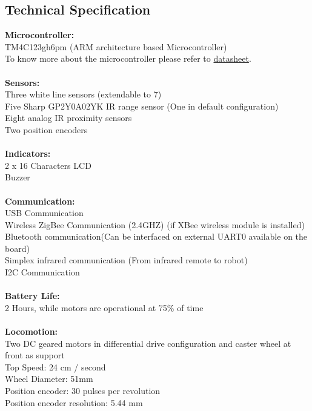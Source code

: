\documentclass[a4paper,10pt,oneside]{article}
\begin{document}
{		\subsection{{\textbf{Technical Specification}}\\}
			{\textbf{Microcontroller:\\}
			TM4C123gh6pm (ARM architecture based Microcontroller)\\ To know more about the microcontroller please refer to \href{www.ti.com/lit/gpn/tm4c123gh6pm}{datasheet}.\\ \\}
			{\textbf{Sensors:}\\
			Three white line sensors (extendable to 7)\\
			Five Sharp GP2Y0A02YK IR range sensor (One in default configuration)\\
			Eight analog IR proximity sensors\\
			Two position encoders\\\\} 
			\textbf{Indicators:\\}
			{2 x 16 Characters LCD\\
			Buzzer\\\\}
			\textbf{Communication:\\}
			{USB Communication\\
			Wireless ZigBee Communication (2.4GHZ) (if XBee wireless module is installed)\\
			Bluetooth communication(Can be interfaced on external UART0 available on the board)\\
			Simplex infrared communication (From infrared remote to robot)\\
			I2C Communication \\\\}
			\textbf{Battery Life:\\}
			{2 Hours, while motors are operational at 75\% of time\\\\}
			\textbf{Locomotion:\\}
			{Two DC geared motors in differential drive configuration and caster wheel at front as support\\
			Top Speed: 24 cm / second\\
			Wheel Diameter: 51mm\\
			Position encoder: 30 pulses per revolution\\
			Position encoder resolution: 5.44 mm\\
			\\
			\\
			\\
			\\
			\\}
		
}
\end{document}
